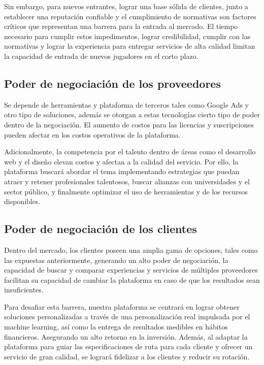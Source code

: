Sin embargo, para nuevos entrantes, lograr una base sólida de clientes, junto a establecer una reputación confiable y el cumplimiento de normativas son factores críticos que representan una barrera para la entrada al mercado. El tiempo necesario para cumplir estos impedimentos, lograr credibilidad, cumplir con las normativas y lograr la experiencia para entregar servicios de alta calidad limitan la capacidad de entrada de nuevos jugadores en el corto plazo.

\subsection*{Poder de negociación de los proveedores}
Se depende de herramientas y plataforma de terceros tales como Google Ads y otro tipo de soluciones, además se otorgan a estas tecnologías cierto tipo de poder dentro de la negociación. El aumento de costos para las licencias y suscripciones pueden afectar en los costos operativos de la plataforma.

Adicionalmente, la competencia por el talento dentro de áreas como el desarrollo web y el diseño elevan costos y afectan a la calidad del servicio. Por ello, la plataforma buscará abordar el tema implementando estrategias que puedan atraer y retener profesionales talentosos, buscar alianzas con universidades y el sector público, y finalmente optimizar el uso de herramientas y de los recursos disponibles.

\subsection*{Poder de negociación de los clientes}
Dentro del mercado, los clientes poseen una amplia gama de opciones, tales como las expuestas anteriormente, generando un alto poder de negociación, la capacidad de buscar y comparar experiencias y servicios de múltiples proveedores facilitan su capacidad de cambiar la plataforma en caso de que los resultados sean insuficientes.

Para desafiar esta barrera, nuestra plataforma se centrará en lograr obtener soluciones personalizadas a través de una personalización real impulsada por el machine learning, así como la entrega de resultados medibles en hábitos financieros. Asegurando un alto retorno en la inversión. Además, al adaptar la plataforma para guiar las especificaciones de ruta para cada cliente y ofrecer un servicio de gran calidad, se logrará fidelizar a los clientes y reducir su rotación.

